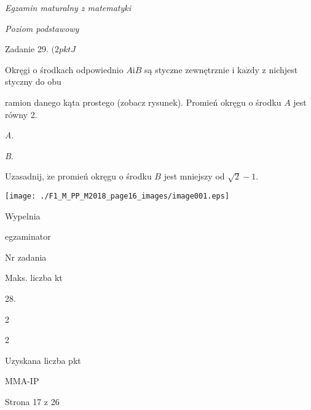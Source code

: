 \documentclass[a4paper,12pt]{article}
\begin{document}
{\it Egzamin maturalny z matematyki}

{\it Poziom podstawowy}

Zadanie 29. $(2pktJ$

Okręgi o środkach odpowiednio $A\mathrm{i}B$ są styczne zewnętrznie i $\mathrm{k}\mathrm{a}\dot{\mathrm{z}}\mathrm{d}\mathrm{y}$ z nichjest styczny do obu

ramion danego kąta prostego (zobacz rysunek). Promień okręgu o środku $A$ jest równy 2.

{\it A}.

{\it B}.

Uzasadnij, $\dot{\mathrm{z}}\mathrm{e}$ promień okręgu o środku $B$ jest mniejszy od $\sqrt{2}-1.$
\begin{center}
\texttt{[image: ./F1\_M\_PP\_M2018\_page16\_images/image001.eps]}
\end{center}
Wypelnia

egzaminator

Nr zadania

Maks. liczba kt

28.

2

2

Uzyskana liczba pkt

MMA-IP

Strona 17 z 26
\end{document}
